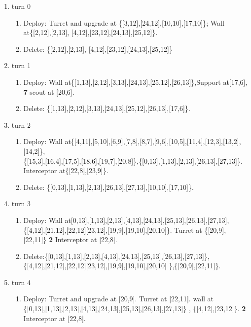 \documentclass[12pt]{article}
\begin{document}
\begin{enumerate}
	\item turn 0
\begin{enumerate}
\item Deploy: Turret and upgrade at \{[3,12],[24,12],[10,10],[17,10]\}; Wall at\{[2,12],[2,13], [4,12],[23,12],[24,13],[25,12]\}.
\item Delete: \{[2,12],[2,13], [4,12],[23,12],[24,13],[25,12]\}
\end{enumerate}
    \item turn 1
\begin{enumerate}
\item Deploy: Wall at\{[1,13],[2,12],[3,13],[24,13],[25,12],[26,13]\},Support at[17,6], \textbf{7} scout at [20,6]. 
\item Delete: \{[1,13],[2,12],[3,13],[24,13],[25,12],[26,13],[17,6]\}.
\end{enumerate}
    \item turn 2
\begin{enumerate}
\item Deploy: Wall at\{[4,11],[5,10],[6,9],[7,8],[8,7],[9,6],[10,5],[11,4],[12,3],[13,2],[14,2]\},\\\{[15,3],[16,4],[17,5],[18,6],[19,7],[20,8]\},\{[0,13],[1,13],[2,13],[26,13],[27,13]\}. Interceptor at\{[22,8],[23,9]\}. 
\item Delete: \{[0,13],[1,13],[2,13],[26,13],[27,13],[10,10],[17,10]\}.
\end{enumerate}
    \item turn 3
\begin{enumerate}
\item Deploy: Wall at{[0,13],[1,13],[2,13],[4,13],[24,13],[25,13],[26,13],[27,13]},\\ \{[4,12],[21,12],[22,12][23,12],[19,9],[19,10],[20,10]\}. Turret at \{[20,9],[22,11]\} \textbf{2} Interceptor at [22,8]. 
\item Delete:\{[0,13],[1,13],[2,13],[4,13],[24,13],[25,13],[26,13],[27,13]\},\\ \{[4,12],[21,12],[22,12][23,12],[19,9],[19,10],[20,10] \},\{[20,9],[22,11]\}.
\end{enumerate}
     \item turn 4
\begin{enumerate}
\item Deploy: Turret and upgrade at [20,9]. Turret at [22,11]. wall at \\ \{[0,13],[1,13],[2,13],[4,13],[24,13],[25,13],[26,13],[27,13]\} , \{[4,12],[23,12]\}. \textbf{2} Interceptor at [22,8].

\end{enumerate}
\end{enumerate}
\end{document}
